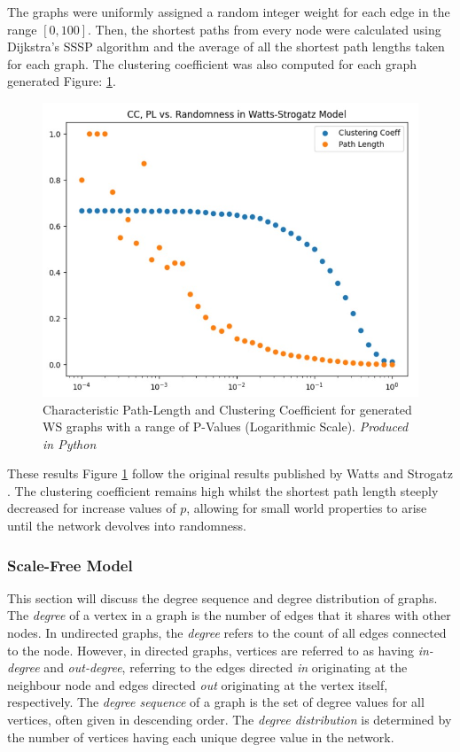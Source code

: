 \documentclass[
	a4paper, %
	10pt, %
	unnumberedsections, %
	twoside, %
]{LTJournalArticle}
\begin{document}
The graphs were uniformly assigned a random integer weight for each edge in the range \([0, 100]\). Then, the shortest paths from every node were calculated using Dijkstra's SSSP algorithm and the average of all the shortest path lengths taken for each graph. The clustering coefficient was also computed for each graph generated Figure: \ref{fig:ws_statistics}. \\

\begin{figure} %
	\includegraphics[width=\linewidth]{Figures/ws_statistics_log.jpg}
	\caption{Characteristic Path-Length and Clustering Coefficient for generated WS graphs with a range of P-Values (Logarithmic Scale). \emph{Produced in Python}}
	\label{fig:ws_statistics}
\end{figure}

These results Figure \ref{fig:ws_statistics} follow the original results published by Watts and Strogatz \cite{watts:98}. The clustering coefficient remains high whilst the shortest path length steeply decreased for increase values of \( p \), allowing for small world properties to arise until the network devolves into randomness. 

\subsubsection{Scale-Free Model}

This section will discuss the degree sequence and degree distribution of graphs. The \emph{degree} of a vertex in a graph is the number of edges that it shares with other nodes. In undirected graphs, the \emph{degree} refers to the count of all edges connected to the node. However, in directed graphs, vertices are referred to as having \emph{in-degree} and \emph{out-degree}, referring to the edges directed \emph{in} originating at the neighbour node and edges directed \emph{out} originating at the vertex itself, respectively. The \emph{degree sequence} of a graph is the set of degree values for all vertices, often given in descending order. The \emph{degree distribution} is determined by the number of vertices having each unique degree value in the network. \\
\end{document}
